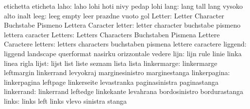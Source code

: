                            etichetta                 eticheta
                     laho: laho                      lohi
                           hoti                      nivy
                           pedap                     lohi %
                     lang: lang                      tall
                           lang                      vysoko
                           alto                      inalt %
                     leeg: leeg                      empty
                           leer                      prazdne
                           vuoto                     gol
                   Letter: Letter                    Character
                           Buchstabe                 Pismeno
                           Lettera                   Caracter
                   letter: letter                    character
                           buchstabe                 pismeno
                           lettera                   caracter
                  Letters: Letters                   Characters
                           Buchstaben                Pismena
                           Lettere                   Caractere
                  letters: letters                   characters
                           buchstaben                pismena
                           lettere                   caractere
                  liggend: liggend                   landscape
                           querformat                nasirku
                           orizzontale               vedere
                     lijn: lijn                      rule
                           linie                     linka
                           linea                     rigla
                    lijst: lijst                     list
                           liste                     seznam
                           lista                     lista
              linkermarge: linkermarge               leftmargin
                           linkerrand                levyokraj
                           marginesinistro           marginestanga
             linkerpagina: linkerpagina              leftpage
                           linkerseite               levastranka
                           paginasinistra            paginastanga
               linkerrand: linkerrand                leftedge
                           linkekante                levahrana
                           bordosinistro             bordurastanga
                    links: links                     left
                           links                     vlevo
                           sinistra                  stanga
